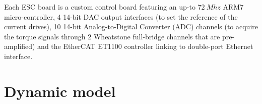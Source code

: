 \documentclass[journal]{IEEEtran}
\begin{document}
Each ESC board is a custom control board featuring an up-to $72 \ Mhz$ ARM7 micro-controller, 4 14-bit DAC output interfaces (to set the reference of the current drives), 10 14-bit Analog-to-Digital Converter (ADC) channels (to acquire the torque signals through 2 Wheatstone full-bridge channels that are pre-amplified) and the EtherCAT ET1100 controller linking to double-port Ethernet interface.

\section{Dynamic model} \label{sec:dynamic_model}
\end{document}
